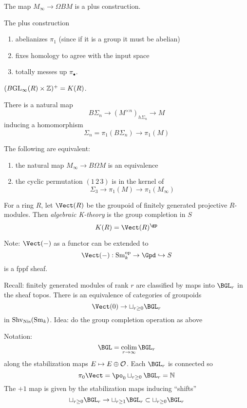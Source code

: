 \documentclass[12pt]{article}
\begin{document}
\begin{theorem}
The map $M_{\infty} \to \Omega B M$ is a plus construction.
\end{theorem}

\begin{rmk}
The plus construction
\begin{enumerate}
\item abelianizes $\pi_1$ (since if it is a group it must be abelian)
\item fixes homology to agree with the input space
\item totally messes up $\pi_\bullet$.
\end{enumerate}
\end{rmk}

\begin{example}
$(B \mathrm{GL}_\infty(R) \times \mathbb{Z})^+ = K(R)$. 
\end{example}

There is a natural map
\[ B \Sigma_n \to (M^{\times n})_{h \Sigma_n} \to M \]
inducing a homomorphism
\[ \Sigma_n = \pi_1(B \Sigma_n) \to \pi_1(M) \]

\begin{theorem}
The following are equivalent:
\begin{enumerate}
\item the natural map $M_\infty \to B \Omega M$ is an equivalence
\item the cyclic permutation $(1 \, 2 \, 3)$ is in the kernel of 
\[ \Sigma_3 \to \pi_1(M) \to \pi_1(M_\infty) \]
\end{enumerate}
\end{theorem}

\begin{defn}
For a ring $R$, let $\Vect(R)$ be the groupoid of finitely generated projective $R$-modules. Then \textit{algebraic K-theory} is the group completion in $S$ 
\[ K(R) = \Vect(R)^{\gp} \]
\end{defn}

Note: $\Vect(-)$ as a functor can be extended to
\[ \Vect(-) : \Sm^{\op}_k \to \Gpd \embed S \]
is a fppf sheaf.

Recall: finitely generated modules of rank $r$ are classified by maps into $\BGL_r$ in the sheaf topos. There is an equivalence of categories of groupoids 
\[ \Vect(0) \to \sqcup_{r \ge 0} \BGL_r \]
in $\mathrm{Shv}_{\mathrm{Nis}}(\mathrm{Sm}_k)$. 
Idea: do the group completion operation as above
\begin{center}
\end{center}
Notation: 
\[ \BGL = \colim_{r \to \infty} \BGL_r \]
along the stabilization maps $E \mapsto E \oplus \mathcal{O}_{}$. Each $\BGL_r$ is connected so
\[ \pi_0 \Vect = \po_0 \sqcup_{r \ge 0} \BGL_r = \N \]
The $+1$ map is given by the stabilization maps inducing ``shifts''
\[ \sqcup_{r \ge 0} \BGL_r \to \sqcup_{r \ge 1} \BGL_r \subset \sqcup_{r \ge 0} \BGL_r \]
\end{document}
